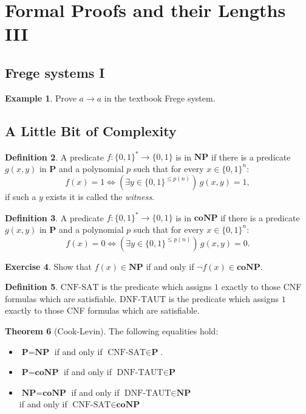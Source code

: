 \documentclass{article}
\theoremstyle{definition}
\newtheorem{thrm}{Theorem}
\newtheorem{excs}[thrm]{Exercise}
\newtheorem{exmp}[thrm]{Example}
\newtheorem{defi}[thrm]{Definition}
\renewcommand{\P}{\textbf{P}}
\newcommand{\NP}{\textbf{NP}}
\newcommand{\coNP}{\textbf{coNP}}
\begin{document}
\section*{Formal Proofs and their Lengths III}

\subsection*{Frege systems I}

\begin{exmp}
    Prove $a \to a$ in the textbook Frege system.
\end{exmp}

\subsection*{A Little Bit of Complexity}

\begin{defi}
    A predicate $f: \{0,1\}^* \to \{0,1\}$ is in $\NP$ if there is a predicate $g(x,y)$ in $\P$ and a polynomial $p$ such that for every $x\in \{0,1\}^n$:
    \[ f(x)=1 \iff (\exists y\in\{0,1\}^{\leq p(n)}) \, g(x,y)=1, \]
    if such a $y$ exists it is called the \emph{witness}.
\end{defi}

\begin{defi}
    A predicate $f: \{0,1\}^* \to \{0,1\}$ is in $\coNP$ if there is a predicate $g(x,y)$ in $\P$ and a polynomial $p$ such that for every $x\in \{0,1\}^n$:
    \[ f(x)=0 \iff (\exists y\in\{0,1\}^{\leq p(n)}) \, g(x,y)=0.\]
\end{defi}

\begin{excs}
    Show that $f(x)\in \NP$ if and only if $\lnot f(x) \in \coNP$. 
\end{excs}

\begin{defi}
    $\text{CNF-SAT}$ is the predicate which assigns $1$ exactly to those CNF formulas which are satisfiable.
    $\text{DNF-TAUT}$ is the predicate which assigns $1$ exactly to those CNF formulas which are satisfiable.
\end{defi}

\begin{thrm}[Cook-Levin]
    The following equalities hold:

    \begin{itemize}
        \item $\P=\NP$ if and only if $\text{CNF-SAT}\in \P$.
        \item $\P=\coNP$ if and only if $\text{DNF-TAUT} \in \P$
        \item $\NP=\coNP$ if and only if $\text{DNF-TAUT} \in \NP$ \\
        if and only if $\text{CNF-SAT}\in \coNP$
    \end{itemize}
\end{thrm}
\end{document}
